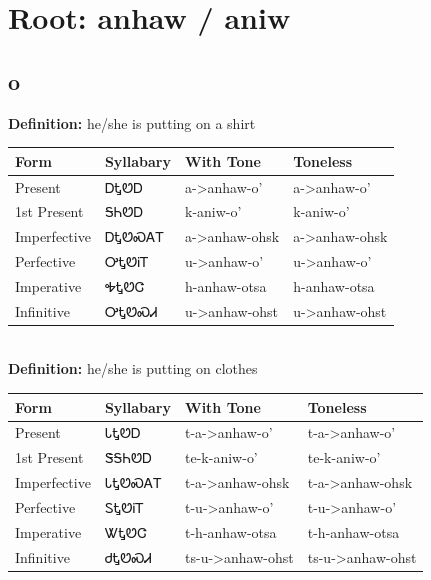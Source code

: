 \documentclass{article}%
\begin{document}
%
\normalsize%
\section*{Root: anhaw / aniw}%
\subsection*{o}%
\textbf{Definition: }%
he/she is putting on a shirt%
\\[0.5em]%
\begin{tabular}{|l|l|l|l|}%
\hline%
\textbf{Form}&\textbf{Syllabary}&\textbf{With Tone}&\textbf{Toneless}\\%
\hline%
Present&ᎠᎿᏬᎠ&a{-}>anhaw{-}o'&a{-}>anhaw{-}o'\\%
1st Present&ᎦᏂᏬᎠ&k{-}aniw{-}o'&k{-}aniw{-}o'\\%
Imperfective&ᎠᎿᏬᏍᎪᎢ&a{-}>anhaw{-}ohsk&a{-}>anhaw{-}ohsk\\%
Perfective&ᎤᎿᏬᎥᎢ&u{-}>anhaw{-}o'&u{-}>anhaw{-}o'\\%
Imperative&ᎭᎿᏬᏣ&h{-}anhaw{-}otsa&h{-}anhaw{-}otsa\\%
Infinitive&ᎤᎿᏬᏍᏗ&u{-}>anhaw{-}ohst&u{-}>anhaw{-}ohst\\%
\hline%
\end{tabular}%
\\[1em]%
\textbf{Definition: }%
he/she is putting on clothes%
\\[0.5em]%
\begin{tabular}{|l|l|l|l|}%
\hline%
\textbf{Form}&\textbf{Syllabary}&\textbf{With Tone}&\textbf{Toneless}\\%
\hline%
Present&ᏓᎿᏬᎠ&t{-}a{-}>anhaw{-}o'&t{-}a{-}>anhaw{-}o'\\%
1st Present&ᏕᎦᏂᏬᎠ&te{-}k{-}aniw{-}o'&te{-}k{-}aniw{-}o'\\%
Imperfective&ᏓᎿᏬᏍᎪᎢ&t{-}a{-}>anhaw{-}ohsk&t{-}a{-}>anhaw{-}ohsk\\%
Perfective&ᏚᎿᏬᎥᎢ&t{-}u{-}>anhaw{-}o'&t{-}u{-}>anhaw{-}o'\\%
Imperative&ᏔᎿᏬᏣ&t{-}h{-}anhaw{-}otsa&t{-}h{-}anhaw{-}otsa\\%
Infinitive&ᏧᎿᏬᏍᏗ&ts{-}u{-}>anhaw{-}ohst&ts{-}u{-}>anhaw{-}ohst\\%
\hline%
\end{tabular}%
\\[1em]%
\end{document}
